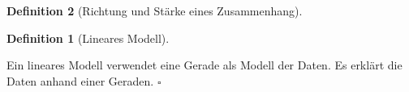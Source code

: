 \documentclass[
  a4paper,
  DIV=11]{scrreprt}
\theoremstyle{definition}
\theoremstyle{definition}
\theoremstyle{definition}
\newtheorem{definition}{Definition}[chapter]
\theoremstyle{remark}
\begin{document}
\begin{definition}[Richtung und Stärke eines
Zusammenhang]
\begin{definition}[Lineares
Modell]\protect\hypertarget{def-lm}{}\label{def-lm}

Ein lineares Modell verwendet eine Gerade als Modell der Daten. Es
erklärt die Daten anhand einer Geraden. \(\square\)

\end{definition}

\begin{figure}

\begin{minipage}{0.50\linewidth}



\end{minipage}%
%
\begin{minipage}{0.50\linewidth}

\end{minipage}
\end{figure}
\end{definition}
\end{document}
